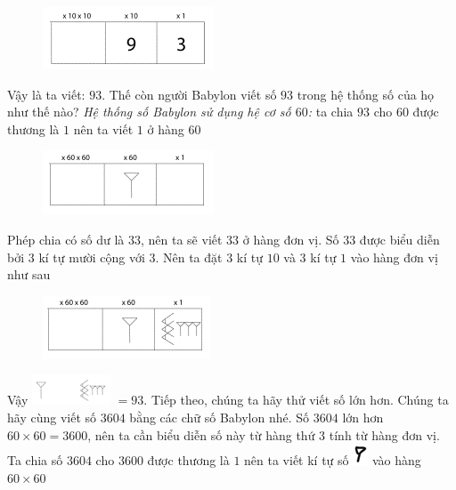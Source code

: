 \begin{multicols}{2}
\begin{figure}[H]
		\includegraphics[width=0.65\linewidth]{20}
		\vspace*{-10pt}
	\end{figure}
	Vậy là ta viết: $93$.
	\vskip 0.1cm
	Thế còn người Babylon viết số $93$ trong hệ thống số của họ như thế nào?
	\vskip 0.1cm
	\textit{Hệ thống số Babylon sử dụng hệ cơ số $60$:} ta chia $93$ cho $60$ được thương là $1$ nên ta viết $1$ ở hàng $60$
	\begin{figure}[H]
		\centering
		\vspace*{-5pt}
		\captionsetup{labelformat= empty, justification=centering}
		\includegraphics[width=0.65\linewidth]{21}
		\vspace*{-10pt}
	\end{figure}
	Phép chia có số dư là $33$, nên ta sẽ viết $33$ ở hàng đơn vị. Số $33$ được biểu diễn bởi $3$ kí tự mười cộng với $3$. Nên ta đặt $3$ kí tự $10$ và $3$ kí tự $1$ vào hàng đơn vị như sau
	\begin{figure}[H]
		\centering
		\vspace*{-5pt}
		\captionsetup{labelformat= empty, justification=centering}
		\includegraphics[width=0.65\linewidth]{22}
		\vspace*{-10pt}
	\end{figure}
	Vậy \includegraphics[scale=0.85]{23}  $= 93$.
	\vskip 0.1cm
	Tiếp theo, chúng ta hãy thử viết số lớn hơn. Chúng ta hãy cùng viết số $3604$ bằng các chữ số Babylon nhé. Số $3604$ lớn hơn $60\times 60=3600$, nên ta cần biểu diễn số này từ hàng thứ $3$ tính từ hàng đơn vị. Ta chia số $3604$ cho $3600$ được thương là $1$ nên ta viết kí tự số \includegraphics[scale=0.7]{15}  vào hàng $60\times60$

\end{multicols}
